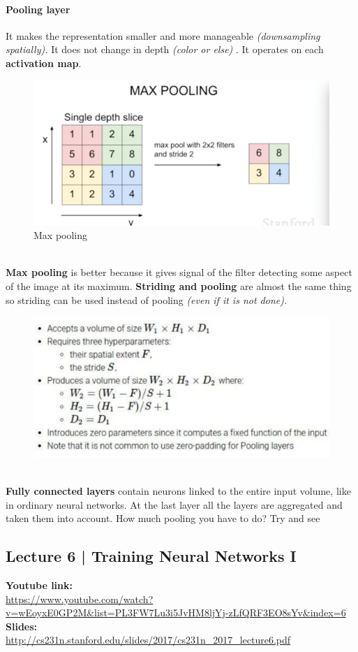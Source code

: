 \documentclass[11pt]{article}
\begin{document}
\paragraph{Pooling layer}
It makes the representation smaller and more manageable \textit{(downsampling spatially).}
It does not change in depth \textit{(color or else)} . It operates on each \textbf{activation map}.
\begin{figure}[h]
\centering
\captionsetup{justification=centering}
\includegraphics[width=0.7\linewidth]{L418.pdf}
\caption{ Max  pooling}
\label{fig:L418}
\end{figure}\\
\textbf{Max pooling} is better because it gives signal of the filter detecting some aspect of the image at its maximum. \textbf{Striding and pooling } are almost the same thing so striding can be used instead of pooling \textit{(even if it is not done).}
\begin{figure}[h]
\centering
\captionsetup{justification=centering}
\includegraphics[width=0.75\linewidth]{L419.pdf}
\label{fig:L419}
\end{figure}\\
\textbf{Fully connected layers} contain neurons linked to the entire input volume, like in ordinary neural networks. At the last layer all the layers are aggregated  and taken them into account. How much pooling you have to do? Try and see 
\clearpage

\subsection{Lecture 6 | Training Neural Networks I}
\textbf{Youtube link:}\\
\url{https://www.youtube.com/watch?v=wEoyxE0GP2M&list=PL3FW7Lu3i5JvHM8ljYj-zLfQRF3EO8sYv&index=6}\\
\textbf{Slides:}\\
\url{http://cs231n.stanford.edu/slides/2017/cs231n_2017_lecture6.pdf}
\end{document}
